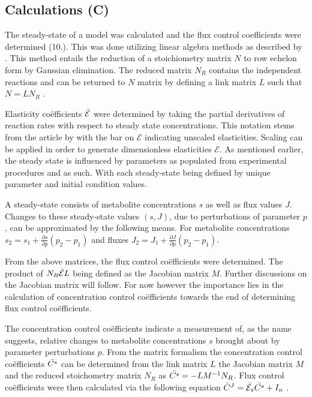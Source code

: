 \subsection{Calculations (C)} \label{Calculations}
The \gls{steady-state} of a model was calculated and the flux control coefficients were determined (10.). This was done utilizing linear algebra methods as described by \citeauthor{Hofmeyr2001}. This method entails the reduction of a stoichiometry matrix $N$ to row echelon form by Gaussian elimination. The reduced matrix $N_R$ contains the independent reactions and can be returned to $N$ matrix by defining a link matrix $L$ such that $N = LN_R$ \cite{Hofmeyr2001}.

Elasticity co\"efficients $\Bar{\mathcal{E}}$ were determined by taking the partial derivatives of reaction rates with respect to steady state concentrations. This notation stems from the article by \citeauthor{Hofmeyr2001} with the bar on $\mathcal{E}$ indicating unscaled elasticities. Scaling can be applied in order to generate dimensionless elasticities $\mathcal{E}$. As mentioned earlier, the steady state is influenced by parameters as populated from experimental procedures and as such. With each steady-state being defined by unique parameter and initial condition values. 

A steady-state consists of metabolite concentrations $s$ as well as flux values $J$. Changes to these steady-state values $(s,J)$, due to perturbations of parameter $p$, can be approximated by the following means. For metabolite concentrations $s_2 = s_1 + \frac{\partial s}{\partial p}(p_2 - p_1)$ and fluxes $J_2 = J_1 + \frac{\partial J}{\partial p}(p_2 - p_1)$. 

From the above matrices, the flux control co\"efficients were determined. The product of $N_R\Bar{\mathcal{E}}L$ being defined as the Jacobian matrix $M$. Further discussions on the Jacobian matrix will follow. For now however the importance lies in the calculation of concentration control co\"efficients towards the end of determining flux control co\"efficients.

The concentration control co\"efficients indicate a measurement of, as the name suggests, relative changes to metabolite concentrations $s$ brought about by parameter perturbations $p$. From the matrix formalism the concentration control co\"efficients $\Bar{C^s}$ can be determined from the link matrix $L$ the Jacobian matrix $M$ and the reduced stoichometry matrix $N_R$ as $\Bar{C^s}=-LM^{-1}N_R$. Flux control co\"efficients were then calculated via the following equation $\Bar{C}^J = \Bar{\mathcal{E}_s}\Bar{C^s}+ I_n$ \cite{Hofmeyr2001}.

